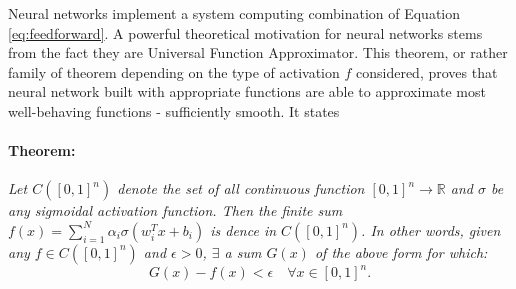 Neural networks implement a system computing combination of Equation \ref{eq:feedforward}. A powerful theoretical motivation for neural networks stems from the fact they are Universal Function Approximator. This theorem, or rather family of theorem depending on the type of activation $f$ considered, proves that neural network built with appropriate functions are able to approximate most well-behaving functions - sufficiently smooth. It states \cite{universalFuncApproxNN,HORNIK1989359:} 
\paragraph{Theorem:} \textit{Let $C([0, 1]^n)$ denote the set of all continuous function $[0, 1]^n \rightarrow \mathbb{R}$ and $\sigma$ be any sigmoidal activation function. Then the finite sum $f(x) = \sum_{i=1}^N \alpha_i \sigma(w_i^T x + b_i)$ is dence in $C([0, 1]^n)$. In other words, given any $f \in C([0, 1]^n)$ and $\epsilon > 0$, $\exists$ a sum $G(x)$ of the above form for which: \[ G(x) - f(x) < \epsilon \quad \forall x \in [0, 1]^n.\]}

